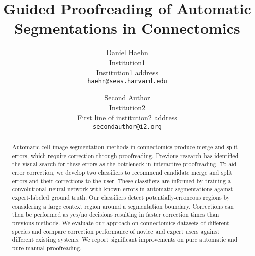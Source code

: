 \documentclass[10pt,twocolumn,letterpaper]{article}
\begin{document}
\title{Guided Proofreading of Automatic Segmentations in Connectomics}

\author{Daniel Haehn\\
Institution1\\
Institution1 address\\
{\tt\small haehn@seas.harvard.edu}
\and
Second Author\\
Institution2\\
First line of institution2 address\\
{\tt\small secondauthor@i2.org}
}

\maketitle

\begin{abstract}
Automatic cell image segmentation methods in connectomics produce merge and split errors, which require correction through proofreading. Previous research has identified the visual search for these errors as the bottleneck in interactive proofreading. To aid error correction, we develop two classifiers to recommend candidate merge and split errors and their corrections to the user. These classifiers are informed by training a convolutional neural network with known errors in automatic segmentations against expert-labeled ground truth. Our classifiers detect potentially-erroneous regions by considering a large context region around a segmentation boundary. Corrections can then be performed as yes/no decisions 
resulting in faster correction times than previous methods. We evaluate our approach on connectomics datasets of different species and compare correction performance of novice and expert users against different existing systems. We report significant improvements on pure automatic and pure manual proofreading.
\end{abstract}












{\small


}
\end{document}
